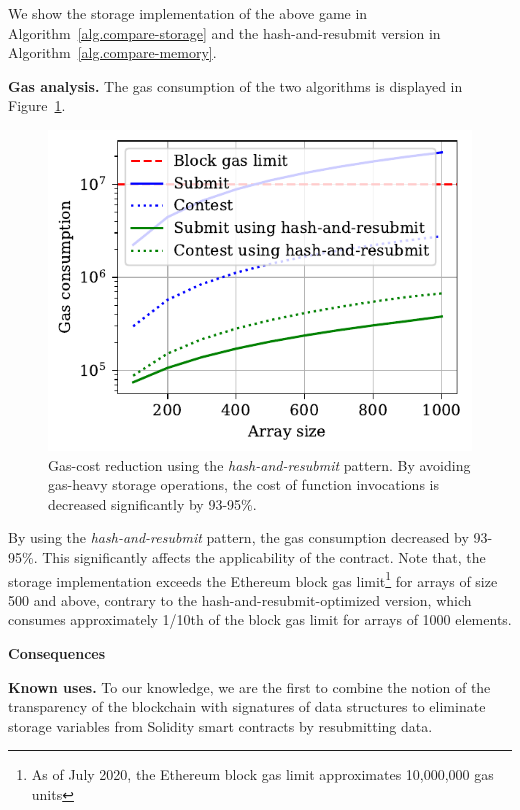We show the storage implementation of the above game in
Algorithm~\ref{alg.compare-storage} and the hash-and-resubmit version in
Algorithm~\ref{alg.compare-memory}.



\noindent \textbf{Gas analysis.} The gas consumption of the two
algorithms is displayed in Figure~\ref{fig:har-example}.

\begin{figure}[h!]
\begin{center}
\includegraphics[width=1 \columnwidth]{figures/har-example.pdf}
\end{center}
\caption{Gas-cost reduction using the \emph{hash-and-resubmit} pattern. By
avoiding gas-heavy storage operations, the cost of function invocations is
decreased significantly by 93-95\%.}
\label{fig:har-example}
\end{figure}

By using the \emph{hash-and-resubmit} pattern, the gas consumption decreased by
93-95\%. This significantly affects the applicability of the contract. Note
that, the storage implementation exceeds the Ethereum block gas
limit\footnote{As of July 2020, the Ethereum block gas limit approximates
10,000,000 gas units} for arrays of size 500 and above, contrary to the
hash-and-resubmit-optimized version, which consumes approximately 1/10th of the
block gas limit for arrays of 1000 elements.

\noindent
\textbf{Consequences}

\noindent \textbf{Known uses.} To our knowledge, we are the first to combine
the notion of the transparency of the blockchain with signatures of data
structures to eliminate storage variables from Solidity smart contracts by
resubmitting data.


